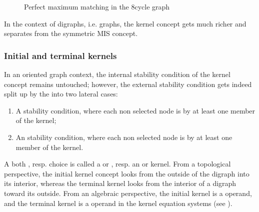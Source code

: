 \documentclass[a4paper,12pt,english]{sphinxhowto}
\let\sphinxpxdimen\pdfpxdimen\else\newdimen\sphinxpxdimen
\begin{document}
\begin{figure}[H]
\centering
\capstart

\noindent\sphinxincludegraphics[width=300\sphinxpxdimen]{{maxMatchingcycleGraph}.png}
\caption{Perfect maximum matching in the 8\sphinxhyphen{}cycle graph}\label{\detokenize{pearls:id103}}\end{figure}

\sphinxAtStartPar
In the context of digraphs, i.e.  graphs, the kernel concept gets much richer and separates from the symmetric MIS concept.


\subsubsection{Initial and terminal kernels}
\label{\detokenize{pearls:initial-and-terminal-kernels}}
\sphinxAtStartPar
In an oriented graph context, the internal stability condition of the kernel concept remains untouched; however, the external stability condition gets indeed split up by the  into two lateral cases:
\begin{enumerate}
%
\item {} 
\sphinxAtStartPar
A  stability condition, where each non selected node is  by at least one member of the kernel;

\item {} 
\sphinxAtStartPar
An  stability condition, where each non selected node is  by at least one member of the kernel.

\end{enumerate}

\sphinxAtStartPar
A both   , resp.  choice is called a  or , resp. an  or  kernel. From a topological perspective, the initial kernel concept looks from the outside of the digraph into its interior, whereas the terminal kernel looks from the interior of a digraph toward its outside. From an algebraic perspective, the initial kernel is a  operand, and the terminal kernel is a  operand in the kernel equation systems (see ).
\end{document}
